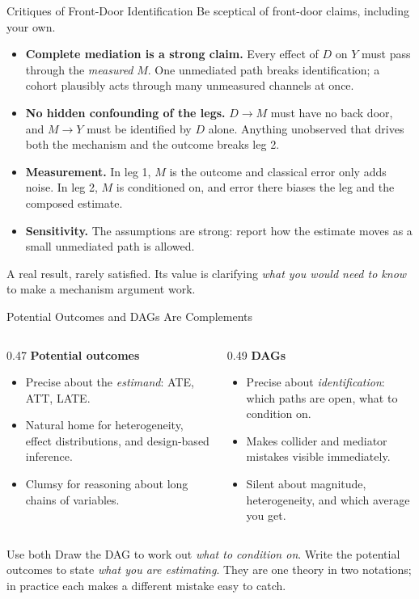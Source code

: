 \documentclass[aspectratio=169,11pt,xcolor=dvipsnames]{beamer}
\begin{document}
\begin{frame}{Critiques of Front-Door Identification}
Be sceptical of front-door claims, including your own.
\begin{itemize}\itemsep2pt
  \item \textbf{Complete mediation is a strong claim.} Every effect of $D$
        on $Y$ must pass through the \emph{measured} $M$. One unmediated path
        breaks identification; a cohort plausibly acts through many
        unmeasured channels at once.
  \item \textbf{No hidden confounding of the legs.} $D \to M$ must have no
        back door, and $M \to Y$ must be identified by $D$ alone. Anything
        unobserved that drives both the mechanism and the outcome breaks
        leg 2.
  \item \textbf{Measurement.} In leg 1, $M$ is the outcome and classical error
        only adds noise. In leg 2, $M$ is conditioned on, and error there
        biases the leg and the composed estimate.
  \item \textbf{Sensitivity.} The assumptions are strong: report how the
        estimate moves as a small unmediated path is allowed.
\end{itemize}
\vskip3pt
A real result, rarely satisfied. Its value is clarifying \emph{what you
would need to know} to make a mechanism argument work.
\end{frame}

\begin{frame}{Potential Outcomes and DAGs Are Complements}
\begin{columns}[T]
\begin{column}{0.47\textwidth}
\textbf{Potential outcomes}
\begin{itemize}\small\itemsep2pt
  \item Precise about the \emph{estimand}: ATE, ATT, LATE.
  \item Natural home for heterogeneity, effect distributions, and
        design-based inference.
  \item Clumsy for reasoning about long chains of variables.
\end{itemize}
\end{column}
\begin{column}{0.49\textwidth}
\textbf{DAGs}
\begin{itemize}\small\itemsep2pt
  \item Precise about \emph{identification}: which paths are open, what to
        condition on.
  \item Makes collider and mediator mistakes visible immediately.
  \item Silent about magnitude, heterogeneity, and which average you get.
\end{itemize}
\end{column}
\end{columns}
\vskip8pt
\begin{block}{Use both}
Draw the DAG to work out \emph{what to condition on}. Write the potential
outcomes to state \emph{what you are estimating}. They are one theory in two
notations; in practice each makes a different mistake easy to catch.
\end{block}
\end{frame}
\end{document}
